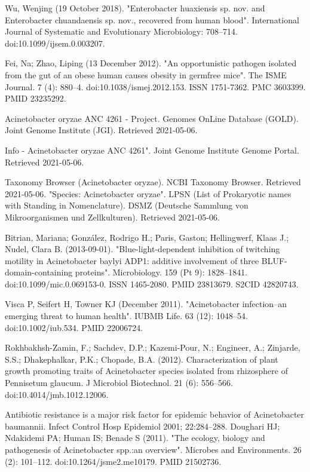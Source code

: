 \documentclass[11pt]{article}
\begin{document}
\begin{thebibliography}{3}
		 Wu, Wenjing (19 October 2018). "Enterobacter huaxiensis sp. nov. and Enterobacter chuandaensis sp. nov., recovered from human blood". International Journal of Systematic and Evolutionary Microbiology: 708–714. doi:10.1099/ijsem.0.003207.
		
		 Fei, Na; Zhao, Liping (13 December 2012). "An opportunistic pathogen isolated from the gut of an obese human causes obesity in germfree mice". The ISME Journal. 7 (4): 880–4. doi:10.1038/ismej.2012.153. ISSN 1751-7362. PMC 3603399. PMID 23235292.
		
		  Acinetobacter oryzae ANC 4261 - Project. Genomes OnLine Database (GOLD). Joint Genome Institute (JGI). Retrieved 2021-05-06.
		 
		 Info - Acinetobacter oryzae ANC 4261". Joint Genome Institute Genome Portal. Retrieved 2021-05-06.
		
		 Taxonomy Browser (Acinetobacter oryzae). NCBI Taxonomy Browser. Retrieved 2021-05-06.
		"Species: Acinetobacter oryzae". LPSN (List of Prokaryotic names with Standing in Nomenclature). DSMZ (Deutsche Sammlung von Mikroorganismen und Zellkulturen). Retrieved 2021-05-06.
		
		 Bitrian, Mariana; González, Rodrigo H.; Paris, Gaston; Hellingwerf, Klaas J.; Nudel, Clara B. (2013-09-01). "Blue-light-dependent inhibition of twitching motility in Acinetobacter baylyi ADP1: additive involvement of three BLUF-domain-containing proteins". Microbiology. 159 (Pt 9): 1828–1841. doi:10.1099/mic.0.069153-0. ISSN 1465-2080. PMID 23813679. S2CID 42820743.
		
		 Visca P, Seifert H, Towner KJ (December 2011). "Acinetobacter infection--an emerging threat to human health". IUBMB Life. 63 (12): 1048–54. doi:10.1002/iub.534. PMID 22006724.
		
		 Rokhbakhsh-Zamin, F.; Sachdev, D.P.; Kazemi-Pour, N.; Engineer, A.; Zinjarde, S.S.; Dhakephalkar, P.K.; Chopade, B.A. (2012).
		 Characterization of plant growth promoting traits of Acinetobacter species isolated from rhizosphere of Pennisetum glaucum. J Microbiol Biotechnol. 21 (6): 556–566. doi:10.4014/jmb.1012.12006.
		
		 Antibiotic resistance is a major risk factor for epidemic behavior of Acinetobacter baumannii. Infect Control Hosp Epidemiol 2001; 22:284–288.
		Doughari HJ; Ndakidemi PA; Human IS; Benade S (2011). "The ecology, biology and pathogenesis of Acinetobacter spp.:an overview". Microbes and Environments. 26 (2): 101–112. doi:10.1264/jsme2.me10179. PMID 21502736.
		

\end{thebibliography}
\end{document}
